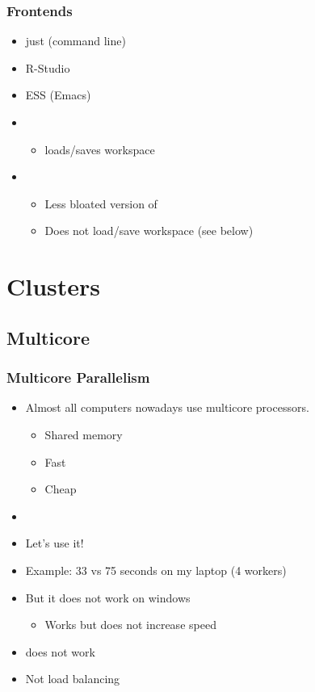 \documentclass[pdftex]{beamer}
\begin{document}
\begin{frame}
  \frametitle{Frontends}
  \begin{itemize}
  \item just  (command line)
  \item R-Studio
  \item ESS (Emacs)
  \item {}
    \begin{itemize}
    \item loads/saves workspace
    \end{itemize}
  \item {}
    \begin{itemize}
    \item Less bloated version of 
    \item Does not load/save workspace (see below)
    \end{itemize}
  \end{itemize}
\end{frame}

\section{Clusters}
\subsection{Multicore}

\begin{frame}
  \frametitle{Multicore Parallelism}
  \begin{itemize}
  \item Almost all computers nowadays use multicore processors.
    \begin{itemize}
    \item Shared memory
    \item Fast
    \item Cheap
    \end{itemize}
  \item {}
  \item Let's use it!
  \item Example: 33 vs 75 seconds on my laptop (4 workers)
    \pause
  \item But it does not work on windows \frownie{}
    \begin{itemize}
    \item Works but does not increase speed
    \end{itemize}
  \item {} does not work
  \item Not load balancing
  \end{itemize}
\end{frame}
\end{document}
